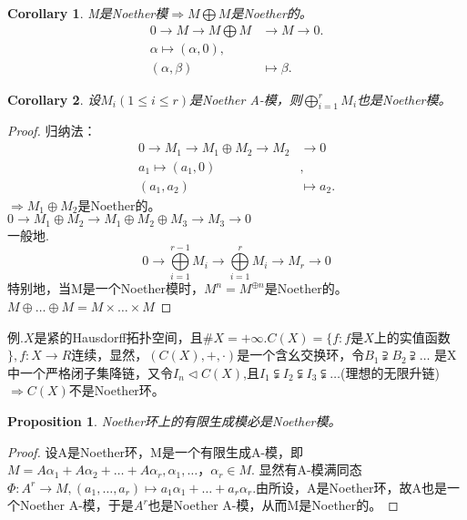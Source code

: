 \documentclass[UTF8]{article}
\newtheorem{cor}{Corollary}[section]
\newtheorem{prop}{Proposition}[section]
\begin{document}
\begin{cor}
	M是Noether模$\Rightarrow M\bigoplus M$是Noether的。\\
	\[
	\begin{split}
	0\longrightarrow M\longrightarrow M\bigoplus M&\longrightarrow M\longrightarrow0.\\
	\alpha\longmapsto(\alpha,0),&\\
	(\alpha,\beta)&\longmapsto\beta.
	\end{split}
	\]
	
	
\end{cor}
\begin{cor}
	设$M_i(1\leq i\leq r)$是Noether A-模，则$\bigoplus\limits_{i=1}^r{M_i}$也是Noether模。
\end{cor}
\begin{proof}
	归纳法：
	\[
	\begin{split}
	0\longrightarrow M_1\longrightarrow M_1\oplus M_2\longrightarrow M_{2}&\longrightarrow0\\
	a_1\longmapsto(a_1,0)&,\\
	(a_1,a_2)&\longmapsto a_2.
	\end{split}
	\]
	$\Rightarrow M_1\oplus M_2$是Noether的。\\
	$0\longrightarrow M_1\oplus M_2\longrightarrow M_1\oplus M_2\oplus M_3\longrightarrow M_3\longrightarrow0$\\
	一般地.
	$$0\longrightarrow\bigoplus\limits_{i=1}^{r-1}M_i\longrightarrow\bigoplus\limits_{i=1}^r{M_i}\longrightarrow M_r\longrightarrow0$$
	特别地，当M是一个Noether模时，$M^n=M^{\oplus n}$是Noether的。\\
	$M\oplus\ldots\oplus M=M\times\ldots\times M$
\end{proof}
例.$X$是紧的Hausdorff拓扑空间，且$\#X=+\infty.C(X)=\{f:f$是$X$上的实值函数$\},f:X\longrightarrow R$连续，显然，$(C(X),+,\cdot)$是一个含幺交换环，令$B_1\supsetneqq B_2\supsetneqq\ldots$ 是X中一个严格闭子集降链，又令$I_n\vartriangleleft C(X)$,且$I_1\subsetneqq I_2\subsetneqq I_3\subsetneqq\ldots$(理想的无限升链)$\Rightarrow C(X)$不是Noether环。\\
\begin{prop}
	Noether环上的有限生成模必是Noether模。
\end{prop}
\begin{proof}
	设A是Noether环，M是一个有限生成A-模，即$M=A\alpha_1+A\alpha_2+\ldots+A\alpha_r,\alpha_1,\ldots ，\alpha_r\in M.$
	显然有A-模满同态$\Phi:A^r\longrightarrow M,(a_1,\ldots,a_r)\longmapsto a_1\alpha_1+\ldots+a_r\alpha_r.$由所设，A是Noether环，故A也是一个Noether A-模，于是$A^r$也是Noether A-模，从而M是Noether的。
\end{proof}
\end{document}
